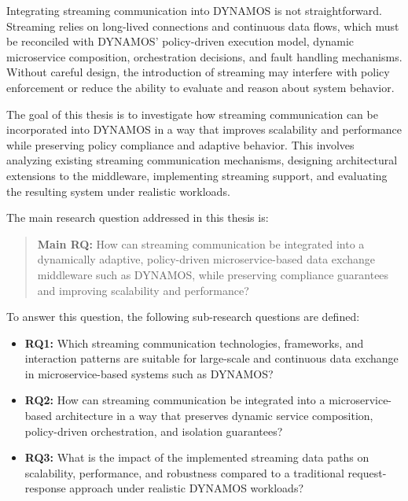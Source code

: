 Integrating streaming communication into DYNAMOS is not straightforward. Streaming relies on long-lived connections and continuous data flows, which must be reconciled with DYNAMOS' policy-driven execution model, dynamic microservice composition, orchestration decisions, and fault handling mechanisms. Without careful design, the introduction of streaming may interfere with policy enforcement or reduce the ability to evaluate and reason about system behavior.

The goal of this thesis is to investigate how streaming communication can be incorporated into DYNAMOS in a way that improves scalability and performance while preserving policy compliance and adaptive behavior. This involves analyzing existing streaming communication mechanisms, designing architectural extensions to the middleware, implementing streaming support, and evaluating the resulting system under realistic workloads.

The main research question addressed in this thesis is:

\begin{quote}
\textbf{Main RQ:} How can streaming communication be integrated into a dynamically adaptive, policy-driven microservice-based data exchange middleware such as DYNAMOS, while preserving compliance guarantees and improving scalability and performance?
\end{quote}

To answer this question, the following sub-research questions are defined:

\begin{itemize}
  \item \textbf{RQ1:}
  Which streaming communication technologies, frameworks, and interaction patterns are suitable for large-scale and continuous data exchange in microservice-based systems such as DYNAMOS?

  \item \textbf{RQ2:}
    How can streaming communication be integrated into a microservice-based architecture in a way that preserves dynamic service composition, policy-driven orchestration, and isolation guarantees?

  \item \textbf{RQ3:}
    What is the impact of the implemented streaming data paths on scalability, performance, and robustness compared to a traditional request-response approach under realistic DYNAMOS workloads?
\end{itemize}

